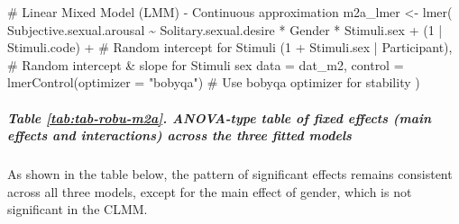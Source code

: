 \documentclass[
  bookmarksnumbered]{article}
\newenvironment{Shaded}{\begin{snugshade}}{\end{snugshade}}
\newcommand{\AttributeTok}[1]{\textcolor[rgb]{0.80,0.80,0.80}{#1}}
\newcommand{\CommentTok}[1]{\textcolor[rgb]{0.50,0.62,0.50}{#1}}
\newcommand{\DecValTok}[1]{\textcolor[rgb]{0.86,0.86,0.80}{#1}}
\newcommand{\FunctionTok}[1]{\textcolor[rgb]{0.94,0.94,0.56}{#1}}
\newcommand{\NormalTok}[1]{\textcolor[rgb]{0.80,0.80,0.80}{#1}}
\newcommand{\OtherTok}[1]{\textcolor[rgb]{0.94,0.94,0.56}{#1}}
\newcommand{\SpecialCharTok}[1]{\textcolor[rgb]{0.86,0.64,0.64}{#1}}
\newcommand{\StringTok}[1]{\textcolor[rgb]{0.80,0.58,0.58}{#1}}
\begin{document}
\begin{Shaded}
\begin{Highlighting}[]
\CommentTok{\# Linear Mixed Model (LMM) {-} Continuous approximation}
\NormalTok{m2a\_lmer }\OtherTok{\textless{}{-}} \FunctionTok{lmer}\NormalTok{(}
\NormalTok{  Subjective.sexual.arousal }\SpecialCharTok{\textasciitilde{}}\NormalTok{ Solitary.sexual.desire }\SpecialCharTok{*}\NormalTok{ Gender }\SpecialCharTok{*}\NormalTok{ Stimuli.sex }\SpecialCharTok{+}
\NormalTok{    (}\DecValTok{1} \SpecialCharTok{|}\NormalTok{ Stimuli.code) }\SpecialCharTok{+} \CommentTok{\# Random intercept for Stimuli}
\NormalTok{    (}\DecValTok{1} \SpecialCharTok{+}\NormalTok{ Stimuli.sex }\SpecialCharTok{|}\NormalTok{ Participant), }\CommentTok{\# Random intercept \& slope for Stimuli sex}
  \AttributeTok{data =}\NormalTok{ dat\_m2,}
  \AttributeTok{control =} \FunctionTok{lmerControl}\NormalTok{(}\AttributeTok{optimizer =} \StringTok{"bobyqa"}\NormalTok{) }\CommentTok{\# Use \textquotesingle{}bobyqa\textquotesingle{} optimizer for stability}
\NormalTok{)}
\end{Highlighting}
\end{Shaded}

\subparagraph{Table \ref{tab:tab-robu-m2a}. ANOVA-type table of fixed effects (main effects and interactions) across the three fitted models}\label{table-reftabtab-robu-m2a.-anova-type-table-of-fixed-effects-main-effects-and-interactions-across-the-three-fitted-models}

As shown in the table below, the pattern of significant effects remains consistent across all three models, except for the main effect of gender, which is not significant in the CLMM.
\end{document}
